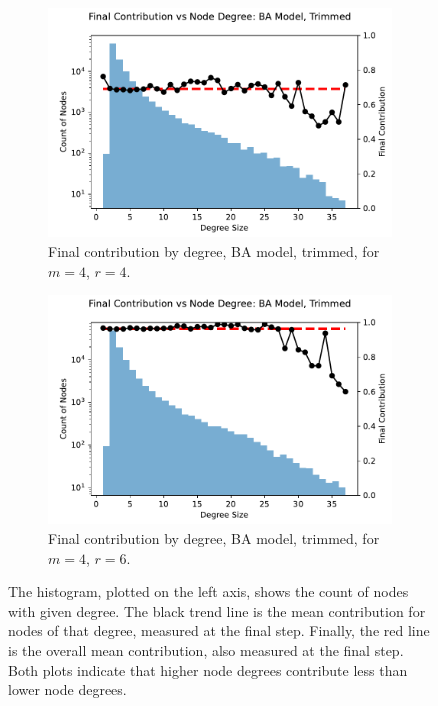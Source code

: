 \FloatBarrier 
\begin{figure}[!h]
  \begin{subfigure}[b]{0.45\textwidth}
    \includegraphics[width=1.1\textwidth]{images/ID_BA_node_groups_m_4_phi_4_trimmed.pdf}
    \caption{Final contribution by degree, BA model, trimmed, for $m=4$, $r=4$.   }
    \label{ID_by_degree_m_4_phi_4}
  \end{subfigure}
  \hfill
  \begin{subfigure}[b]{0.45\textwidth}
    \includegraphics[width=1.1\textwidth]{images/ID_BA_node_groups_m_4_phi_6_trimmed.pdf}
    \caption{Final contribution by degree, BA model, trimmed, for $m=4$, $r=6$. }
    \label{ID_by_degree_m_4_phi_6}
  \end{subfigure}
  \caption{The histogram, plotted on the left axis, shows the count of nodes with given degree. The black trend line is the mean contribution for nodes of that degree, measured at the final step. Finally, the red line is the overall mean contribution, also measured at the final step. Both plots indicate that higher node degrees contribute less than lower node degrees.} \label{ID_by_degree_m_4}
\end{figure} 
\FloatBarrier


